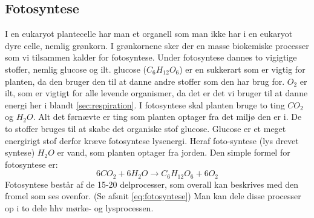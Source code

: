         \subsection*{Fotosyntese}
            I en eukaryot plantecelle har man et organell som man ikke har i en eukaryot dyre celle, nemlig grønkorn. I grønkornene sker der en masse biokemiske processer som vi tilsammen kalder for fotosyntese. Under fotosyntese dannes to vigigtige stoffer, nemlig glucose og ilt. glucose (\begin{math}C_6H_{12}O_6\end{math}) er en sukkerart som er vigtig for planten, da den bruger den til at danne andre stoffer som den har brug for. 
            \begin{math}O_2\end{math} er ilt, som er vigtigt for alle levende organismer, da det er det vi bruger til at danne energi her i blandt \ref{sec:respiration}.
            I fotosyntese skal planten bruge to ting \begin{math}CO_2\end{math} og \begin{math}H_2O\end{math}. Alt det førnævte er ting som planten optager fra det miljø den er i. De to stoffer bruges til at skabe det organiske stof glucose. Glucose er et meget energirigt stof derfor kræve fotosyntese lysenergi. Heraf foto-syntese (lys drevet syntese)  \begin{math}H_2O\end{math} er vand, som planten optager fra jorden.
            Den simple formel for fotosyntese er: \begin{equation} 6CO_2 + 6H_2O \rightarrow C_6H_{12}O_6 + 6O_2 \end{equation}\label{eq:fotosyntese}
            Fotosyntese består af de 15-20 delprocesser, som overall kan beskrives med den fromel som ses ovenfor. (Se afsnit \ref{eq:fotosyntese})
            Man kan dele disse processer op i to dele hhv mørke- og lysprocessen. \newline 
